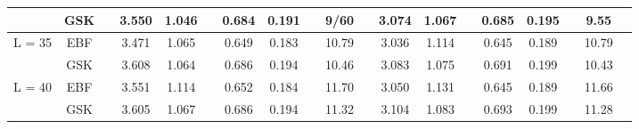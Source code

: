 \documentclass[11pt]{article}
\begin{document}
\begin{landscape}
\begin{table}
\begin{tabular}{lcc c cc c cc c r c cc c cc c r}
         & GSK && 3.550 & 1.046 && 0.684 & 0.191 && 9/60 && 3.074 & 1.067 && 0.685 & 0.195 && 9.55\\
  \midrule
  L = 35 & EBF && 3.471 & 1.065 && 0.649 & 0.183 && 10.79 && 3.036 & 1.114 && 0.645 & 0.189 && 10.79\\
         & GSK && 3.608 & 1.064 && 0.686 & 0.194 && 10.46 && 3.083 & 1.075 && 0.691 & 0.199 && 10.43\\
  \midrule
  L = 40 & EBF && 3.551 & 1.114 && 0.652 & 0.184 && 11.70 && 3.050 & 1.131 && 0.645 & 0.189 && 11.66\\
         & GSK && 3.605 & 1.067 && 0.686 & 0.194 && 11.32 && 3.104 & 1.083 && 0.693 & 0.199 && 11.28\\
  \bottomrule
  \end{tabular}
\end{table}
\end{landscape}


\end{document}
